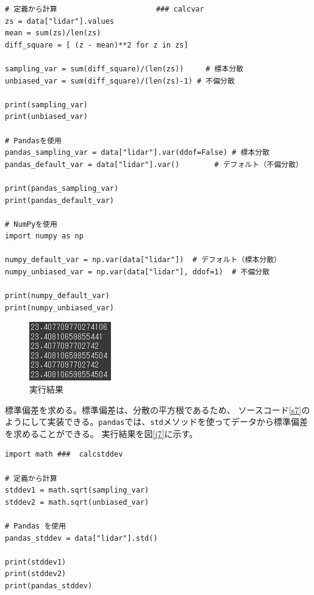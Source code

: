\begin{lstlisting}[caption=分散の計算,label=s6]
# 定義から計算　                     ### calcvar
zs = data["lidar"].values  
mean = sum(zs)/len(zs)
diff_square = [ (z - mean)**2 for z in zs]

sampling_var = sum(diff_square)/(len(zs))     # 標本分散
unbiased_var = sum(diff_square)/(len(zs)-1) # 不偏分散

print(sampling_var)
print(unbiased_var)

# Pandasを使用
pandas_sampling_var = data["lidar"].var(ddof=False) # 標本分散
pandas_default_var = data["lidar"].var()        # デフォルト（不偏分散）

print(pandas_sampling_var)
print(pandas_default_var)

# NumPyを使用
import numpy as np

numpy_default_var = np.var(data["lidar"])  # デフォルト（標本分散）
numpy_unbiased_var = np.var(data["lidar"], ddof=1)  # 不偏分散

print(numpy_default_var)
print(numpy_unbiased_var)
\end{lstlisting}


\begin{figure}[htbp]
  \begin{center}
  \includegraphics[width=.3\linewidth]{img/6.png}
  \caption{実行結果}
  \label{j6}
  \end{center}
\end{figure}

標準偏差を求める。標準偏差は、分散の平方根であるため、
ソースコード\ref{s7}\cite{robo}のようにして実装できる。\verb|pandas|では、\verb|std|メソッドを使ってデータから標準偏差を求めることができる。
実行結果を図\ref{j7}に示す。
\begin{lstlisting}[caption=標準偏差の計算,label=s7]
import math ###  calcstddev

# 定義から計算
stddev1 = math.sqrt(sampling_var)
stddev2 = math.sqrt(unbiased_var)
 
# Pandas を使用 
pandas_stddev = data["lidar"].std()
  
print(stddev1)
print(stddev2)
print(pandas_stddev)
\end{lstlisting}

